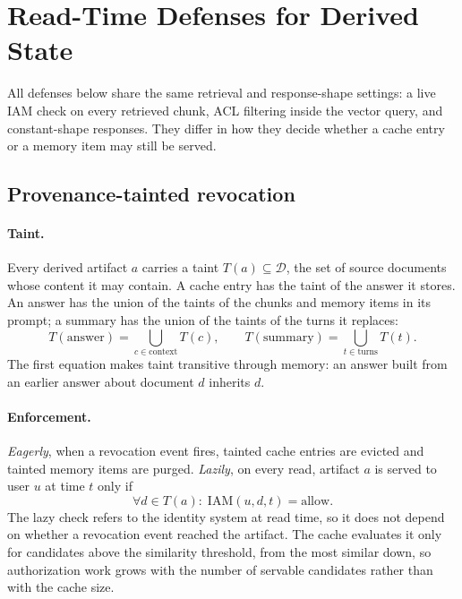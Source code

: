 \section{Read-Time Defenses for Derived State}
\label{sec:defense}

All defenses below share the same retrieval and response-shape settings: a live IAM check on every
retrieved chunk, ACL filtering inside the vector query, and constant-shape responses. They differ in
how they decide whether a cache entry or a memory item may still be served.

\subsection{Provenance-tainted revocation}
\paragraph{Taint.}
Every derived artifact $a$ carries a taint $T(a)\subseteq\mathcal{D}$, the set of source documents
whose content it may contain. A cache entry has the taint of the answer it stores. An answer has the
union of the taints of the chunks and memory items in its prompt; a summary has the union of the
taints of the turns it replaces:
\begin{equation}
T(\mathrm{answer}) = \bigcup_{c\in\mathrm{context}} T(c), \qquad
T(\mathrm{summary}) = \bigcup_{t\in\mathrm{turns}} T(t).
\end{equation}
The first equation makes taint transitive through memory: an answer built from an earlier answer
about document $d$ inherits $d$.

\paragraph{Enforcement.}
\emph{Eagerly}, when a revocation event fires, tainted cache entries are evicted and tainted memory
items are purged. \emph{Lazily}, on every read, artifact $a$ is served to user $u$ at time $t$ only if
\begin{equation}
\forall d\in T(a):\; \mathrm{IAM}(u,d,t)=\text{allow}.
\label{eq:lazy}
\end{equation}
The lazy check refers to the identity system at read time, so it does not depend on whether a
revocation event reached the artifact. The cache evaluates it only for candidates above the
similarity threshold, from the most similar down, so authorization work grows with the number of
servable candidates rather than with the cache size.

